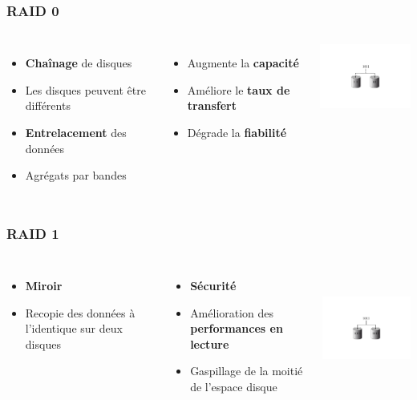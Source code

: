 \begin{frame}
\frametitle{RAID 0}
\begin{columns}
\begin{itemize}
\item \textbf{Chaînage} de disques
\item Les disques peuvent être différents
\item \textbf{Entrelacement} des données
\item Agrégats par bandes
\end{itemize}
\begin{itemize}
\item Augmente la \textbf{capacité}
\item Améliore le \textbf{taux de transfert}
\item Dégrade la \textbf{fiabilité}
\end{itemize}
\includegraphics[width=4cm]{../illustration/RAID0.pdf}
\end{columns}
\end{frame}


\begin{frame}
\frametitle{RAID 1}
\begin{columns}
\begin{itemize}
\item \textbf{Miroir}
\item Recopie des données à l'identique sur deux disques
\end{itemize}
\begin{itemize}
\item \textbf{Sécurité}
\item Amélioration des \textbf{performances en lecture}
\item Gaspillage de la moitié de l’espace disque
\end{itemize}
\includegraphics[height=4cm]{../illustration/RAID1.pdf}
\end{columns}
\end{frame}


